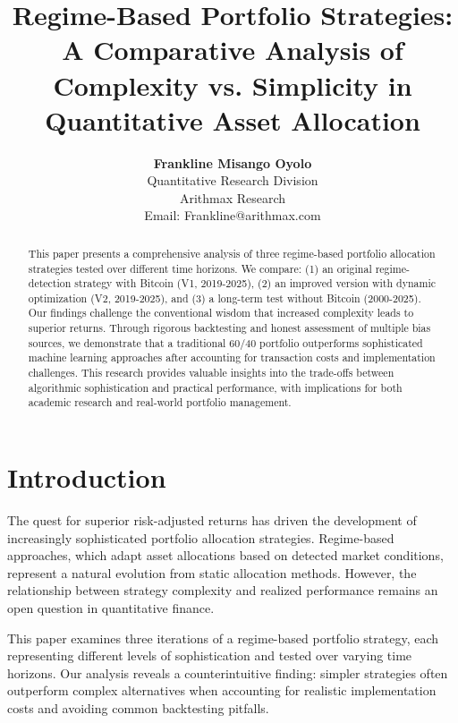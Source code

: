 \documentclass[twocolumn,ieee]{arithmaxresearch}
\begin{document}
\title{Regime-Based Portfolio Strategies: \\
A Comparative Analysis of Complexity vs. Simplicity in Quantitative Asset Allocation}

\author{
\textbf{Frankline Misango Oyolo} \\
Quantitative Research Division \\
Arithmax Research \\
Email: Frankline@arithmax.com \\
}

\maketitle

\begin{abstract}
This paper presents a comprehensive analysis of three regime-based portfolio allocation strategies tested over different time horizons. We compare: (1) an original regime-detection strategy with Bitcoin (V1, 2019-2025), (2) an improved version with dynamic optimization (V2, 2019-2025), and (3) a long-term test without Bitcoin (2000-2025). Our findings challenge the conventional wisdom that increased complexity leads to superior returns. Through rigorous backtesting and honest assessment of multiple bias sources, we demonstrate that a traditional 60/40 portfolio outperforms sophisticated machine learning approaches after accounting for transaction costs and implementation challenges. This research provides valuable insights into the trade-offs between algorithmic sophistication and practical performance, with implications for both academic research and real-world portfolio management.
\end{abstract}

\section{Introduction}

The quest for superior risk-adjusted returns has driven the development of increasingly sophisticated portfolio allocation strategies. Regime-based approaches, which adapt asset allocations based on detected market conditions, represent a natural evolution from static allocation methods. However, the relationship between strategy complexity and realized performance remains an open question in quantitative finance.

This paper examines three iterations of a regime-based portfolio strategy, each representing different levels of sophistication and tested over varying time horizons. Our analysis reveals a counterintuitive finding: simpler strategies often outperform complex alternatives when accounting for realistic implementation costs and avoiding common backtesting pitfalls.
\end{document}
